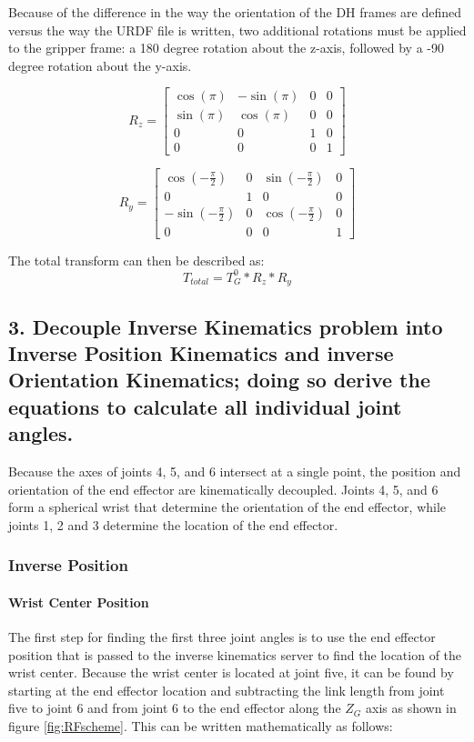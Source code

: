 \documentclass{article}
\begin{document}
Because of the difference in the way the orientation of the DH frames are defined versus the way the URDF file is written, two additional rotations must be applied to the gripper frame: a 180 degree rotation about the z-axis, followed by a -90 degree rotation about the y-axis.

\[R_z = 
\begin{bmatrix}
    \cos(\pi) & -\sin(\pi) & 0 & 0 \\
    \sin(\pi) & \cos(\pi) & 0 & 0 \\
    0 & 0 & 1 & 0 \\
    0 & 0 & 0 & 1
\end{bmatrix}
\]

\[R_y = 
\begin{bmatrix}
    \cos(-\frac{\pi}{2}) & 0 & \sin(-\frac{\pi}{2}) & 0 \\
    0 & 1 & 0 & 0 \\
    -\sin(-\frac{\pi}{2}) & 0 & \cos(-\frac{\pi}{2}) & 0 \\
   0 & 0 & 0 & 1
\end{bmatrix}
\]

The total transform can then be described as:
\[T_{total} = T_G^0 * R_z * R_y \]


\subsection{3. Decouple Inverse Kinematics problem into Inverse Position Kinematics and inverse Orientation Kinematics; doing so derive the equations to calculate all individual joint angles.}
Because the axes of joints 4, 5, and 6 intersect at a single point, the position and orientation of the end effector are kinematically decoupled. Joints 4, 5, and 6 form a spherical wrist that determine the orientation of the end effector, while joints 1, 2 and 3 determine the location of the end effector.

\subsubsection{Inverse Position}

\paragraph{Wrist Center Position}

The first step for finding the first three joint angles is to use the end effector position that is passed to the inverse kinematics server to find the location of the wrist center. Because the wrist center is located at joint five, it can be found by starting at the end effector location and subtracting the link length from joint five to joint 6 and from joint 6 to the end effector along the $Z_G$ axis as shown in figure \ref{fig:RFscheme}.
This can be written mathematically as follows:
\end{document}
